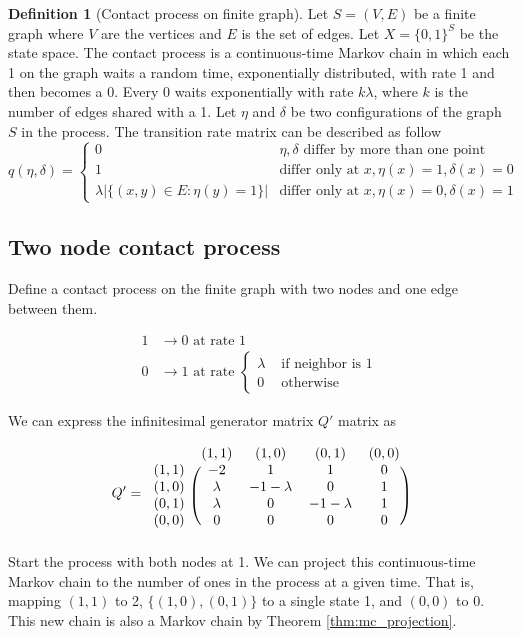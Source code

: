 \documentclass{article}
\theoremstyle{plain}
\theoremstyle{definition}
\newtheorem{defn}[theorem]{Definition}
\theoremstyle{remark}
\numberwithin{equation}{section}
\begin{document}
\begin{defn}[Contact process on finite graph]
Let $S = (V,E)$ be a finite graph where $V$ are the vertices and $E$ is the set of edges.
Let $X =  \{0,1\}^S$ be the state space.
The contact process is a continuous-time Markov chain in which each 1 on the graph waits a random time, exponentially distributed, with rate 1 and then becomes a 0.
Every 0 waits exponentially with rate $k \lambda$, where $k$ is the number of edges shared with a 1.
Let $\eta$ and $\delta$ be two configurations of the graph $S$ in the process.
The transition rate matrix can be described as follow
$$
q(\eta, \delta) = \begin{cases}
    0 & \eta, \delta \text{ differ by more than one point}\\
    1 & \text{differ only at } x, \eta(x) = 1, \delta(x) = 0\\
    \lambda |\{ (x,y) \in E : \eta(y) = 1\}| & \text{differ only at } x, \eta(x) = 0, \delta(x) = 1
\end{cases}
$$
\end{defn}

\subsection{Two node contact process}

Define a contact process on the finite graph with two nodes and one edge between them.

\begin{align}
    1 &\to 0 \text{ at rate } 1\\
    0 &\to 1 \text{ at rate } \begin{cases}
        \lambda & \text{ if neighbor is 1}\\
        0 & \text{ otherwise}
    \end{cases}
\end{align}

We can express the infinitesimal generator matrix $Q'$ matrix as

$$
Q' = \begin{blockarray}{ccccc}
    & (1,1) & (1,0) & (0,1) & (0,0)\\
    \begin{block}{c(cccc)}
        (1,1) & -2 & 1 & 1 & 0\\
        (1,0) & \lambda & - 1 - \lambda & 0 & 1\\
        (0,1) & \lambda & 0 & - 1 - \lambda & 1\\
        (0,0) & 0 & 0 & 0 & 0\\
    \end{block}
\end{blockarray}
$$
Start the process with both nodes at 1.
We can project this continuous-time Markov chain to the number of ones in the process at a given time.
That is, mapping $(1,1)$ to 2, $\{(1,0),(0,1)\}$ to a single state 1, and $(0,0)$ to 0.
This new chain is also a Markov chain by Theorem \ref{thm:mc_projection}.
\end{document}
